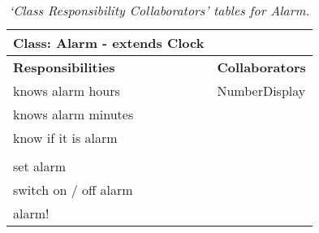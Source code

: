 \documentclass[a4paper,11pt,twoside]{article}
\begin{document}
\begin{table}[h]
\centering
\caption{\textit{`Class Responsibility Collaborators' tables for
    Alarm.}}
\label{tab:crcalarm}
\begin{tabular}{l|l}
Class: Alarm - extends Clock &                        \\ \hline
\textbf{Responsibilities} & \textbf{Collaborators} \\
knows alarm hours         & NumberDisplay          \\
knows alarm minutes       &                        \\
know if it is alarm       &                        \\
                          &                        \\
set alarm                 &                        \\
switch on / off alarm     &                        \\
alarm!                    &                       
\end{tabular}
\end{table}
\end{document}

